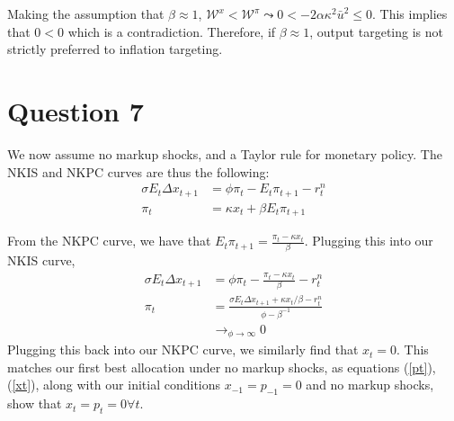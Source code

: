 \documentclass[11pt]{article} %
\begin{document}
Making the assumption that $\beta \approx 1 $, $\mathcal{W}^{x} < \mathcal{W}^{\pi} \leadsto 0< -2\alpha\kappa^2  \bar{u}^2 \leq0$. This implies that $0<0$ which is a contradiction. Therefore, if $\beta \approx 1$, output targeting is not strictly preferred to inflation targeting.
\section{Question 7}
We now assume no markup shocks, and a Taylor rule for monetary policy. The NKIS and NKPC curves are thus the following:
\begin{align*}
\sigma E_t \Delta x_{t+1} &= \phi \pi_t - E_t\pi_{t+1} - r_t^n\\
\pi_t &= \kappa x_t + \beta E_t\pi_{t+1}
\end{align*}

From the NKPC curve, we have that $E_{t}\pi_{t+1} = \frac{\pi_t-\kappa x_t }{\beta}$. Plugging this into our NKIS curve,
\begin{align*}
\sigma E_t \Delta x_{t+1} &= \phi \pi_t -\frac{\pi_t-\kappa x_t }{\beta} - r_t^n\\
\pi_t &= \frac{\sigma E_t\Delta x_{t+1} + \kappa x_t/\beta - r_t^n}{\phi - \beta^{-1}}\\
&\rightarrow_{\phi \rightarrow \infty} 0
\end{align*}
 Plugging this back into our NKPC curve, we similarly find that $x_t = 0$. This matches our first best allocation under no markup shocks, as equations (\ref{pt}),(\ref{xt}), along with our initial conditions $x_{-1} = p_{-1} = 0$ and no markup shocks, show that $x_t = p_t = 0 \forall t$.
\end{document}
